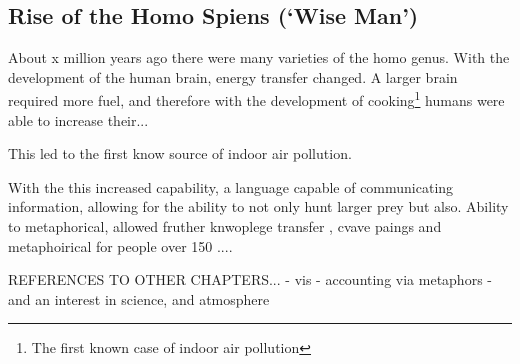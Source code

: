 \subsection{Rise of the Homo Spiens (`Wise Man')}
About x million years ago there were many varieties of the homo genus. With the development of the human brain, energy transfer changed. A larger brain required more fuel, and therefore with the development of cooking\footnote{The first known case of indoor air pollution} humans were able to increase their... 

This led to the first know source of indoor air pollution. 


With the this increased capability, a language capable of communicating information, allowing for the ability to not only hunt larger prey but also. 
Ability to metaphorical, allowed fruther knwoplege transfer , cvave paings and metaphoirical for people over 150 .... 

REFERENCES TO OTHER CHAPTERS... 
- vis 
- accounting via metaphors
- and an interest in science, and atmosphere 
